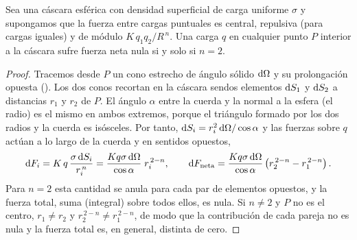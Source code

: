 \begin{proposicion}\label{prop:cavendish}
Sea una cáscara esférica con densidad superficial de carga uniforme $\sigma$ y supongamos que
la fuerza entre cargas puntuales es central, repulsiva (para cargas iguales) y de módulo
$K\,q_1q_2/R^{\,n}$. Una carga $q$ en cualquier punto $P$ interior a la cáscara sufre fuerza neta nula
si y solo si $n=2$.
\end{proposicion}
\begin{proof}
Tracemos desde $P$ un cono estrecho de ángulo sólido $\mathrm{d}\Omega$ y su prolongación opuesta
(). Los dos conos recortan en la cáscara sendos elementos
$\mathrm{d} S_1$ y $\mathrm{d} S_2$ a distancias $r_1$ y $r_2$ de $P$. El ángulo $\alpha$ entre la cuerda y la
normal a la esfera (el radio) es el mismo en ambos extremos, porque el triángulo formado por los dos
radios y la cuerda es isósceles. Por tanto, $\mathrm{d} S_i=r_i^{2}\,\mathrm{d}\Omega/\cos\alpha$ y las fuerzas
sobre $q$ actúan a lo largo de la cuerda y en sentidos opuestos,
\[
  \mathrm{d} F_i=K\,q\,\frac{\sigma\,\mathrm{d} S_i}{r_i^{\,n}}=\frac{K q\sigma\,\mathrm{d}\Omega}{\cos\alpha}\;r_i^{\,2-n},
  \qquad
  \mathrm{d} F_{\mathrm{neta}}=\frac{K q\sigma\,\mathrm{d}\Omega}{\cos\alpha}\left(r_2^{\,2-n}-r_1^{\,2-n}\right).
\]
Para $n=2$ esta cantidad se anula para cada par de elementos opuestos, y la fuerza total, suma
(integral) sobre todos ellos, es nula. Si $n\neq2$ y $P$ no es el centro, $r_1\neq r_2$ y
$r_2^{\,2-n}\neq r_1^{\,2-n}$, de modo que la contribución de cada pareja no es nula y la
fuerza total es, en general, distinta de cero.
\end{proof}



